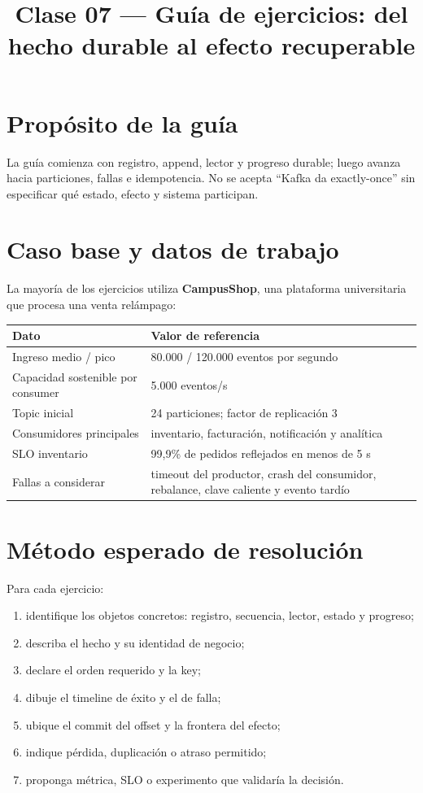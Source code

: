 \documentclass[variant=guia,cover=institutional,mode=screen]{ua-engineering-v6-article}
\title{Clase 07 --- Guía de ejercicios: del hecho durable al efecto recuperable}
\author{\UAProfessor}
\date{\UADate}
\begin{document}
\maketitle
\section{Propósito de la guía}
La guía comienza con registro, append, lector y progreso durable; luego avanza hacia particiones, fallas e idempotencia. No se acepta “Kafka da exactly-once” sin especificar qué estado, efecto y sistema participan.

\section{Caso base y datos de trabajo}

La mayoría de los ejercicios utiliza \textbf{CampusShop}, una plataforma universitaria que procesa una venta relámpago:

\begin{center}
\begin{tabular}{p{}p{}}
\toprule
Dato & Valor de referencia \\
\midrule
Ingreso medio / pico & 80.000 / 120.000 eventos por segundo \\
Capacidad sostenible por consumer & 5.000 eventos/s \\
Topic inicial & 24 particiones; factor de replicación 3 \\
Consumidores principales & inventario, facturación, notificación y analítica \\
SLO inventario & 99,9\% de pedidos reflejados en menos de 5 s \\
Fallas a considerar & timeout del productor, crash del consumidor, rebalance, clave caliente y evento tardío \\
\bottomrule
\end{tabular}
\end{center}

\section{Método esperado de resolución}

Para cada ejercicio:
\begin{enumerate}
\item identifique los objetos concretos: registro, secuencia, lector, estado y progreso;
\item describa el hecho y su identidad de negocio;
\item declare el orden requerido y la key;
\item dibuje el timeline de éxito y el de falla;
\item ubique el commit del offset y la frontera del efecto;
\item indique pérdida, duplicación o atraso permitido;
\item proponga métrica, SLO o experimento que validaría la decisión.
\end{enumerate}
\end{document}
